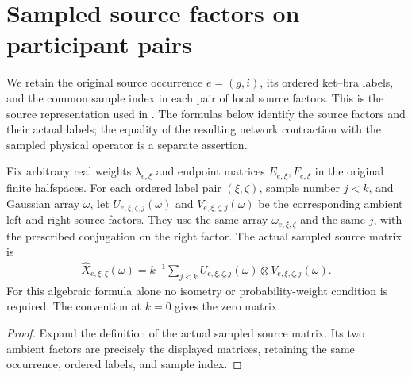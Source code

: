 \section{Sampled source factors on participant pairs}
\label{sec:peps_sampled_source_factors}

We retain the original source occurrence $e=(g,i)$, its ordered ket--bra
labels, and the common sample index in each pair of local source factors.
This is the source representation used in
\cite[proof of Theorem~5.2]{OpenAI2026PolynomialPEPS}.
The formulas below identify the source factors and their actual labels;
the equality of the resulting network contraction with the sampled
physical operator is a separate assertion.

\begin{definition}
    \label{def:peps_sampled_endpoint_factors}
    \leanok
    Fix arbitrary real weights $\lambda_{e,\xi}$ and endpoint matrices
    $E_{e,\xi},F_{e,\xi}$ in the original finite halfspaces. For each ordered
    label pair $(\xi,\zeta)$, sample number $j<k$, and Gaussian array $\omega$,
    let $U_{e,\xi,\zeta,j}(\omega)$ and
    $V_{e,\xi,\zeta,j}(\omega)$ be the corresponding ambient left and right
    source factors. They use the same array $\omega_{e,\xi,\zeta}$ and the same
    $j$, with the prescribed conjugation on the right factor. The actual sampled
    source matrix is
    \begin{align}
        \widehat X_{e,\xi,\zeta}(\omega)
        =k^{-1}\sum_{j<k}U_{e,\xi,\zeta,j}(\omega)
        \otimes V_{e,\xi,\zeta,j}(\omega).
        \label{eq:peps_sampled_endpoint_average}
    \end{align}
    For this algebraic formula alone no isometry or probability-weight condition
    is required. The convention at $k=0$ gives the zero matrix.
\end{definition}

\begin{proof}
    \leanok
    Expand the definition of the actual sampled source matrix. Its two ambient
    factors are precisely the displayed matrices, retaining the same occurrence,
    ordered labels, and sample index.
\end{proof}

